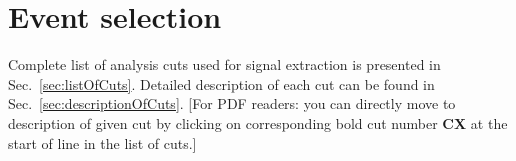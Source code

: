 

\newcommand{\itemm}{\item\hspace*{-5pt}.\hspace*{-1pt}~}

\chapter{Event selection}\label{chap:eventSelection}

Complete list of analysis cuts used for signal extraction is presented in Sec.~\ref{sec:listOfCuts}. Detailed description of each cut can be found in Sec.~\ref{sec:descriptionOfCuts}. [For PDF readers: you can directly move to description of given cut by clicking on corresponding bold cut number \textbf{CX} at the start of line in the list of cuts.]

